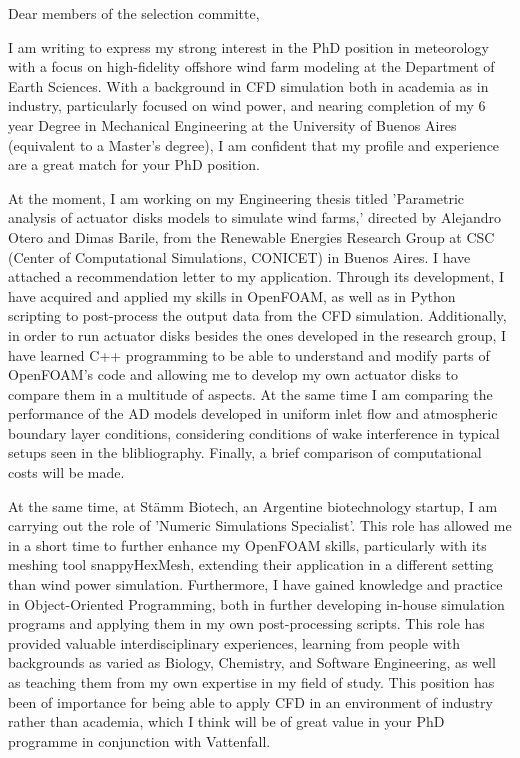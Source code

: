 \documentclass{letter}
\newcommand{\thesisname}{Parametric analysis of actuator disks models to simulate wind farms}
\begin{document}
\begin{letter}{}
\opening{Dear members of the selection committe,}

I am writing to express my strong interest in the PhD position in meteorology with a focus on high-fidelity offshore wind farm modeling at the Department of Earth Sciences.
  With a background in CFD simulation both in academia as in industry, particularly focused on wind power, and nearing completion of my 6 year Degree in Mechanical Engineering at the University of Buenos Aires (equivalent to a Master's degree), I am confident that my profile and experience are a great match for your PhD position.

At the moment, I am working on my Engineering thesis titled '\thesisname,' directed by Alejandro Otero and Dimas Barile, from the Renewable Energies Research Group at CSC (Center of Computational Simulations, CONICET) in Buenos Aires. 
  I have attached a recommendation letter to my application. 
  Through its development, I have acquired and applied my skills in OpenFOAM, as well as in Python scripting to post-process the output data from the CFD simulation. 
  Additionally, in order to run actuator disks besides the ones developed in the research group, I have learned C++ programming to be able to understand and modify parts of OpenFOAM's code and allowing me to develop my own actuator disks to compare them in a multitude of aspects.
  At the same time I am comparing the performance of the AD models developed in uniform inlet flow and atmospheric boundary layer conditions, considering conditions of wake interference in typical setups seen in the blibliography.
  Finally, a brief comparison of computational costs will be made.

At the same time, at Stämm Biotech, an Argentine biotechnology startup, I am carrying out the role of 'Numeric Simulations Specialist'. 
  This role has allowed me in a short time to further enhance my OpenFOAM skills, particularly with its meshing tool snappyHexMesh, extending their application in a different setting than wind power simulation. 
  Furthermore, I have gained knowledge and practice in Object-Oriented Programming, both in further developing in-house simulation programs and applying them in my own post-processing scripts. 
  This role has provided valuable interdisciplinary experiences, learning from people with backgrounds as varied as Biology, Chemistry, and Software Engineering, as well as teaching them from my own expertise in my field of study.
  This position has been of importance for being able to apply CFD in an environment of industry rather than academia, which I think will be of great value in your PhD programme in conjunction with Vattenfall.


\end{letter}
\end{document}
